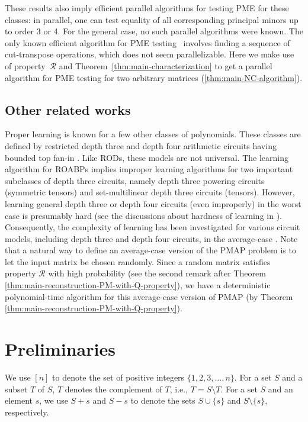 \documentclass[11pt,letterpaper]{article}
\newcommand{\comp}[1]{\overline{#1}}
\newcommand{\prop}{\mathcal{R}}
\begin{document}
{{{These results also imply  efficient parallel algorithms for testing PME for these classes: in parallel, one can test equality of all corresponding principal minors up to order 3 or 4.
%
For the general case, no such parallel algorithms were known. 
%
The only known efficient algorithm for PME testing~\cite{Chatterjee25} involves finding a sequence of cut-transpose operations, which does not seem parallelizable. 
%
Here we make use of property~$\prop$ and Theorem~\ref{thm:main-characterization} to get a parallel algorithm for PME testing for two arbitrary matrices (\cref{thm:main-NC-algorithm}). 






\subsection{Other related works} \label{sec:related works}
Proper learning is known for a few other classes of polynomials. These classes are defined by restricted depth three and depth four arithmetic circuits having bounded top fan-in \cite{Shpilka09a, KarninS09, GuptaKL12, Sinha16, BSV20, BSV21}. Like RODs, these models are not universal. The learning algorithm for ROABPs implies improper learning algorithms for two important subclasses of depth three circuits, namely depth three powering circuits (symmetric tensors) and set-multilinear depth three circuits (tensors). However, learning general depth three or depth four circuits (even improperly) in the worst case is presumably hard (see the discussions about hardness of learning in \cite{KayalS19, GKS20}). Consequently, the complexity of learning has been investigated for various circuit models, including depth three and depth four circuits, in the average-case \cite{GuptaKL11, GKQ14, KayalNS19, KayalS19, GKS20, BGKS22}. Note that a natural way to define an average-case version of the PMAP problem is to let the input matrix be chosen randomly. Since a random matrix satisfies property $\prop$ with high probability (see the second remark after Theorem \ref{thm:main-reconstruction-PM-with-Q-property}), we have a deterministic polynomial-time algorithm for this average-case version of PMAP (by Theorem \ref{thm:main-reconstruction-PM-with-Q-property}).
\section{Preliminaries}
We use $[n]$ to denote the set of positive integers $\{1,2,3,\ldots, n\}$. For a set $S$ and a subset $T$ of $S$, $\comp{T}$ denotes the complement of $T$, i.e., $\comp{T}=S\setminus T$. For a set $S$ and an element $s$, we use $S+s$ and $S-s$ to denote the sets $S\cup\{s\}$ and $S\setminus\{s\}$, respectively.

}}}
\end{document}
